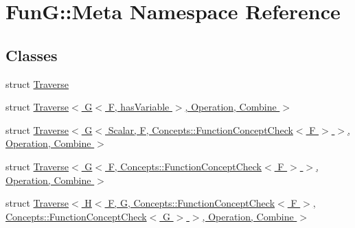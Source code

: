 \hypertarget{namespaceFunG_1_1Meta}{\section{Fun\-G\-:\-:Meta Namespace Reference}
\label{namespaceFunG_1_1Meta}
}
\subsection*{Classes}
\begin{DoxyCompactItemize}
\item 
struct \hyperlink{structFunG_1_1Meta_1_1Traverse}{Traverse}
\item 
struct \hyperlink{structFunG_1_1Meta_1_1Traverse_3_01G_3_01F_00_01hasVariable_01_4_00_01Operation_00_01Combine_01_4}{Traverse$<$ G$<$ F, has\-Variable $>$, Operation, Combine $>$}
\item 
struct \hyperlink{structFunG_1_1Meta_1_1Traverse_3_01G_3_01Scalar_00_01F_00_01Concepts_1_1FunctionConceptCheck_3_056d96032cb56cdcfc81b282c6fc44c83}{Traverse$<$ G$<$ Scalar, F, Concepts\-::\-Function\-Concept\-Check$<$ F $>$ $>$, Operation, Combine $>$}
\item 
struct \hyperlink{structFunG_1_1Meta_1_1Traverse_3_01G_3_01F_00_01Concepts_1_1FunctionConceptCheck_3_01F_01_4_01_473eb79b17eeedd14b27190d68eb8ea5c}{Traverse$<$ G$<$ F, Concepts\-::\-Function\-Concept\-Check$<$ F $>$ $>$, Operation, Combine $>$}
\item 
struct \hyperlink{structFunG_1_1Meta_1_1Traverse_3_01H_3_01F_00_01G_00_01Concepts_1_1FunctionConceptCheck_3_01F_013370ce68fd07becd92320937a020c699}{Traverse$<$ H$<$ F, G, Concepts\-::\-Function\-Concept\-Check$<$ F $>$, Concepts\-::\-Function\-Concept\-Check$<$ G $>$ $>$, Operation, Combine $>$}
\end{DoxyCompactItemize}
